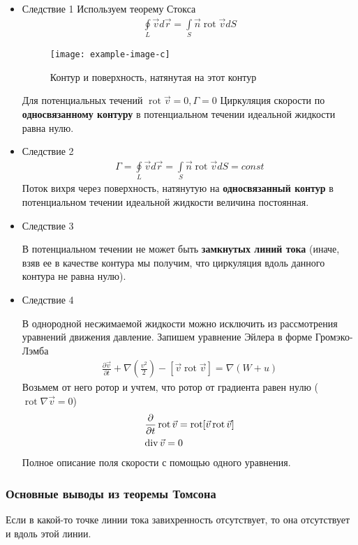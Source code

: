 \begin{itemize}
	\item Следствие 1
	Используем теорему Стокса
	\begin{align*}
	\oint \limits_ { L } \vec { v } d \vec { r } = \int \limits_ { S } \vec { n } \operatorname { rot } \vec { v } d S
	\end{align*}
	\begin{figure}[h]
		\centering
		\texttt{[image: example-image-c]}
		\caption{Контур и поверхность, натянутая на этот контур}
		\label{fig:figure14}
	\end{figure}
	Для потенциальных течений $ \operatorname{r o t} \vec { v } = 0 , \Gamma = 0$
	Циркуляция скорости по \textbf{односвязанному контуру} в потенциальном течении идеальной жидкости равна нулю.
	\item Следствие 2
	\begin{align*}
	\Gamma = \oint \limits_ { L } \vec { v } d \vec { r } = \int \limits_ { S } \vec { n } \operatorname{rot}\vec { v } d S = const
	\end{align*}
	Поток вихря через поверхность, натянутую на  \textbf{односвязанный контур} в потенциальном течении идеальной жидкости величина постоянная. 
	\item Следствие 3

	В потенциальном течении не может быть \textbf{замкнутых линий тока} (иначе, взяв ее в качестве контура мы получим, что циркуляция вдоль данного контура не равна нулю).
	\item Следствие 4

	В однородной несжимаемой жидкости можно исключить из рассмотрения уравнений движения давление.  Запишем уравнение Эйлера в форме Громэко-Лэмба
	\begin{align*}
	\frac { \partial \vec { v } } { \partial t } + \nabla \left( \frac { v ^ { 2 } } { 2 } \right) - [ \vec { v } \operatorname{r o t} \vec { v } ] = \nabla ( W + u )
	\end{align*}
	Возьмем от него ротор и учтем, что ротор от градиента равен нулю ($ \operatorname { rot } \nabla \vec { v } = 0 $)
	\begin{align*}
	&{ \frac { \partial } { \partial t } \operatorname{r o t} \vec { v } = \operatorname{r o t} [ \vec { v } \operatorname{r o t} \vec { v } ] } \\
	&{\operatorname{div} \vec { v } = 0 }
	\end{align*}
	Полное описание поля скорости с помощью одного уравнения.
\end{itemize}
\subsubsection{Основные выводы из теоремы Томсона}
Если в какой-то точке линии тока завихренность отсутствует, то она отсутствует и вдоль этой линии.

